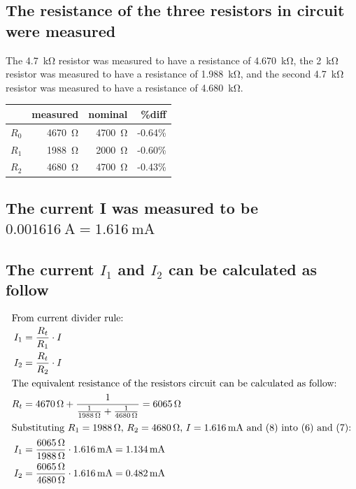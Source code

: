 \documentclass{article}
\begin{document}
\subsection{The resistance of the three resistors in circuit were measured}
The \SI{4.7}{\kilo\ohm} resistor was measured to have a resistance of \SI{4.670}{\kilo\ohm}, the \SI{2}{\kilo\ohm} resistor was measured to have a resistance of \SI{1.988}{\kilo\ohm}, and the second \SI{4.7}{\kilo\ohm} resistor was measured to have a resistance of \SI{4.680}{\kilo\ohm}.
\begin{table}[H]
\centering
    \begin{tabular}{@{}r r r r@{}}
         \toprule
         &measured & nominal & \%diff  \\
         \midrule
        $R_0$&\SI{4670}{\ohm} & \SI{4700}{\ohm} & -0.64\% \\
        $R_1$&\SI{1988}{\ohm} & \SI{2000}{\ohm} & -0.60\% \\ 
        $R_2$&\SI{4680}{\ohm} & \SI{4700}{\ohm} & -0.43\% \\
         \bottomrule
    \end{tabular}
\end{table}

\subsection{The current I was measured to be $\SI{0.001616}{\ampere}=\SI{1.616}{\milli\ampere}$}

\subsection{The current $I_1$ and $I_2$ can be calculated as follow}
\begin{align}
    \intertext{From current divider rule:}
    I_1 &= \frac{R_t}{R_1} \cdot I\\
    I_2 &= \frac{R_t}{R_2} \cdot I\\
    \intertext{The equivalent resistance of the resistors circuit can be calculated as follow:}
    R_t &= \SI{4670}{\ohm}+\frac{1}{\frac{1}{\SI{1988}{\ohm}} + \frac{1}{\SI{4680}{\ohm}}} =\SI{6065}{\ohm}\\
    \intertext{Substituting $R_1=\SI{1988}{\ohm}$, $R_2 = \SI{4680}{\ohm}$, $I=\SI{1.616}{\milli\ampere}$ and (8) into (6) and (7):}
    I_1 &= \frac{\SI{6065}{\ohm}}{\SI{1988}{\ohm}} \cdot \SI{1.616}{\milli\ampere}=\SI{1.134}{\milli\ampere}\\
    I_2 &= \frac{\SI{6065}{\ohm}}{\SI{4680}{\ohm}} \cdot \SI{1.616}{\milli\ampere}=\SI{0.482}{\milli\ampere}\\
\end{align}
\end{document}
